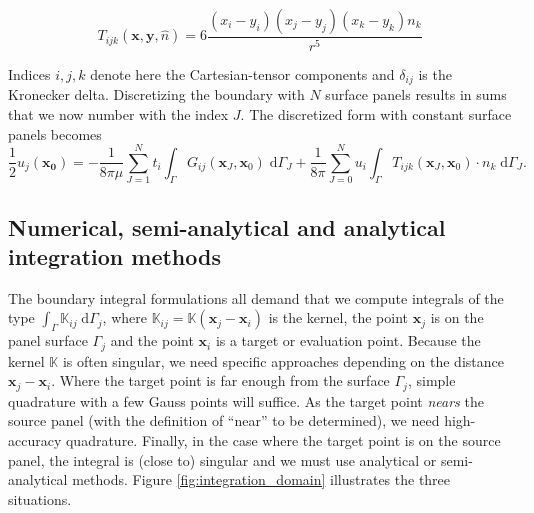 \documentclass[final,3p,times]{elsarticle}
\newcommand{\K}{\mathbb{K}}
\newcommand{\di}[1]{\text{d}#1}
\newcommand{\nhat}{\hat{n}}
\newcommand{\vect}[1]{\mathbf{#1}}
\begin{document}
\begin{equation}
	\label{eqn:stresslet}
	T_{ijk}(\vect{x},\vect{y},\nhat)  =  6\frac{(x_i-y_i)(x_j-y_j)(x_k-y_k)n_k}{r^{5}} \end{equation}

Indices $i, j, k$ denote here the Cartesian-tensor components and $\delta_{ij}$ is the Kronecker delta. Discretizing the boundary with $N$ surface panels results in sums that we now number with the index $J$.
The discretized form with constant surface panels becomes
%
\begin{equation}
	\label{eqn:stokes_bem_discretized}
	\frac{1}{2}u_j(\vect{x_0}) = -\frac{1}{8\pi\mu}\sum_{J=1}^{N}t_i\int_{\Gamma} G_{ij}(\vect{x}_J, \vect{x}_0)\;\di{\Gamma_J} + \frac{1}{8\pi} \sum_{J=0}^{N}u_i\int_{\Gamma} T_{ijk}(\vect{x}_J, \vect{x}_0)\cdot n_k\;\di{\Gamma_J}.
\end{equation}


\subsection{Numerical, semi-analytical and analytical integration methods}

The boundary integral formulations all demand that we compute integrals of the type $\int_{\Gamma} \K_{ij}\;\di{\Gamma_j}$, where $\K_{ij}=\K(\vect{x}_j-\vect{x}_i)$ is the kernel, the point $\vect{x}_j$ is on the panel surface $\Gamma_j$ and the point $\vect{x}_i$ is a target or evaluation point. Because the kernel $\K$ is often singular, we need specific approaches depending on the distance $\vect{x}_j-\vect{x}_i$. Where the target point is far enough from the surface $\Gamma_j$, simple quadrature with a few Gauss points will suffice. As the target point \emph{nears} the source panel (with the definition of ``near'' to be determined), we need high-accuracy quadrature. Finally, in the case where the target point is on the source panel, the integral is (close to) singular and we must use analytical or semi-analytical methods. Figure \ref{fig:integration_domain} illustrates the three situations.
\end{document}
